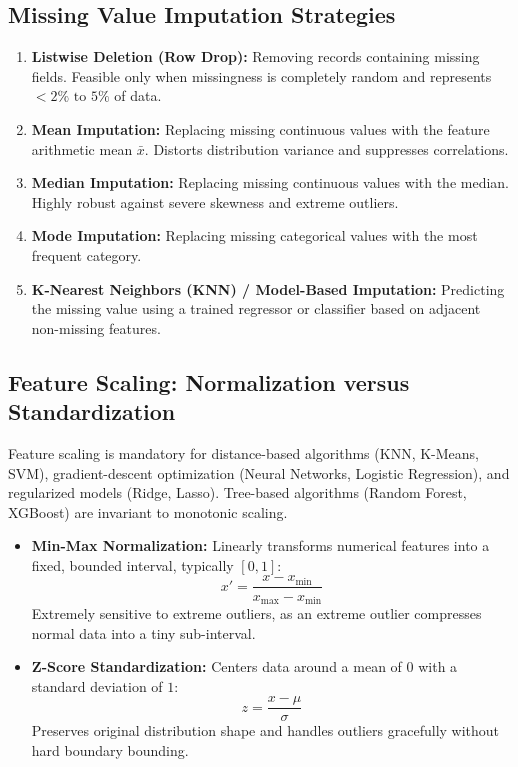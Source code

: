 \subsection{Missing Value Imputation Strategies}
\begin{enumerate}[label=\alph*.]
    \item \textbf{Listwise Deletion (Row Drop):} Removing records containing missing fields. Feasible only when missingness is completely random and represents $<2\%\text{ to }5\%$ of data.
    \item \textbf{Mean Imputation:} Replacing missing continuous values with the feature arithmetic mean $\bar{x}$. Distorts distribution variance and suppresses correlations.
    \item \textbf{Median Imputation:} Replacing missing continuous values with the median. Highly robust against severe skewness and extreme outliers.
    \item \textbf{Mode Imputation:} Replacing missing categorical values with the most frequent category.
    \item \textbf{K-Nearest Neighbors (KNN) / Model-Based Imputation:} Predicting the missing value using a trained regressor or classifier based on adjacent non-missing features.
\end{enumerate}

\subsection{Feature Scaling: Normalization versus Standardization}
Feature scaling is mandatory for distance-based algorithms (KNN, K-Means, SVM), gradient-descent optimization (Neural Networks, Logistic Regression), and regularized models (Ridge, Lasso). Tree-based algorithms (Random Forest, XGBoost) are invariant to monotonic scaling.

\begin{itemize}
    \item \textbf{Min-Max Normalization:} Linearly transforms numerical features into a fixed, bounded interval, typically $[0, 1]$:
    \begin{equation}
    \label{eq:min_max_norm}
    x' = \frac{x - x_{\min}}{x_{\max} - x_{\min}}
    \end{equation}
    Extremely sensitive to extreme outliers, as an extreme outlier compresses normal data into a tiny sub-interval.
    \item \textbf{Z-Score Standardization:} Centers data around a mean of $0$ with a standard deviation of $1$:
    \begin{equation}
    \label{eq:z_score_standardization}
    z = \frac{x - \mu}{\sigma}
    \end{equation}
    Preserves original distribution shape and handles outliers gracefully without hard boundary bounding.
\end{itemize}

